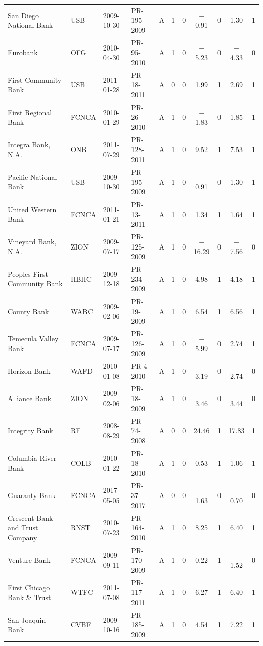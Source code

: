 \begin{table}[!t]
\begin{tabular*}{\textwidth}{@{\extracolsep{\fill}}llllccccccc}
San Diego National Bank & USB & 2009-10-30 & PR-195-2009 & A & 1 & 0 & $-$0.91 & 0 & 1.30 & 1 \\
Eurobank & OFG & 2010-04-30 & PR-95-2010 & A & 1 & 0 & $-$5.23 & 0 & $-$4.33 & 0 \\
First Community Bank & USB & 2011-01-28 & PR-18-2011 & A & 0 & 0 & 1.99 & 1 & 2.69 & 1 \\
First Regional Bank & FCNCA & 2010-01-29 & PR-26-2010 & A & 1 & 0 & $-$1.83 & 0 & 1.85 & 1 \\
Integra Bank, N.A. & ONB & 2011-07-29 & PR-128-2011 & A & 1 & 0 & 9.52 & 1 & 7.53 & 1 \\
Pacific National Bank & USB & 2009-10-30 & PR-195-2009 & A & 1 & 0 & $-$0.91 & 0 & 1.30 & 1 \\
United Western Bank & FCNCA & 2011-01-21 & PR-13-2011 & A & 1 & 0 & 1.34 & 1 & 1.64 & 1 \\
Vineyard Bank, N.A. & ZION & 2009-07-17 & PR-125-2009 & A & 1 & 0 & $-$16.29 & 0 & $-$7.56 & 0 \\
Peoples First Community Bank & HBHC & 2009-12-18 & PR-234-2009 & A & 1 & 0 & 4.98 & 1 & 4.18 & 1 \\
County Bank & WABC & 2009-02-06 & PR-19-2009 & A & 1 & 0 & 6.54 & 1 & 6.56 & 1 \\
Temecula Valley Bank & FCNCA & 2009-07-17 & PR-126-2009 & A & 1 & 0 & $-$5.99 & 0 & 2.74 & 1 \\
Horizon Bank & WAFD & 2010-01-08 & PR-4-2010 & A & 1 & 0 & $-$3.19 & 0 & $-$2.74 & 0 \\
Alliance Bank & ZION & 2009-02-06 & PR-18-2009 & A & 1 & 0 & $-$3.46 & 0 & $-$3.44 & 0 \\
Integrity Bank & RF & 2008-08-29 & PR-74-2008 & A & 0 & 0 & 24.46 & 1 & 17.83 & 1 \\
Columbia River Bank & COLB & 2010-01-22 & PR-18-2010 & A & 1 & 0 & 0.53 & 1 & 1.06 & 1 \\
Guaranty Bank & FCNCA & 2017-05-05 & PR-37-2017 & A & 0 & 0 & $-$1.63 & 0 & $-$0.70 & 0 \\
Crescent Bank and Trust Company & RNST & 2010-07-23 & PR-164-2010 & A & 1 & 0 & 8.25 & 1 & 6.40 & 1 \\
Venture Bank & FCNCA & 2009-09-11 & PR-170-2009 & A & 1 & 0 & 0.22 & 1 & $-$1.52 & 0 \\
First Chicago Bank \& Trust & WTFC & 2011-07-08 & PR-117-2011 & A & 1 & 0 & 6.27 & 1 & 6.40 & 1 \\
San Joaquin Bank & CVBF & 2009-10-16 & PR-185-2009 & A & 1 & 0 & 4.54 & 1 & 7.22 & 1 \\

\end{tabular*}
\end{table}
